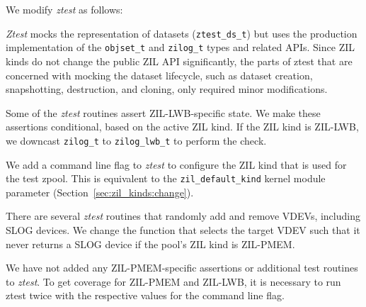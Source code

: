 \documentclass[12pt,a4paper,twoside]{book}
\begin{document}
{We modify \textit{ztest} as follows:
\begin{description}[noitemsep]
    \item[Mocking]  \textit{Ztest} mocks the representation of datasets (\lstinline{ztest_ds_t}) but uses the production implementation of the \lstinline{objset_t} and \lstinline{zilog_t} types and related APIs.
        Since ZIL kinds do not change the public ZIL API significantly, the parts of ztest that are concerned with mocking the dataset lifecycle, such as dataset creation, snapshotting, destruction, and cloning, only required minor modifications.
    \item[ZIL-LWB-Specific Assertions] Some of the \textit{ztest} routines assert ZIL-LWB-specific state.
        We make these assertions conditional, based on the active ZIL kind.
        If the ZIL kind is ZIL-LWB, we downcast \lstinline{zilog_t} to \lstinline{zilog_lwb_t} to perform the check.
    \item[Configurable ZIL Kinds] We add a command line flag to \textit{ztest} to configure the ZIL kind that is used for the test zpool.
        This is equivalent to the \lstinline{zil_default_kind} kernel module parameter (Section~\ref{sec:zil_kinds:change}).
    \item[VDEV Management] There are several \textit{ztest} routines that randomly add and remove VDEVs, including SLOG devices.
        We change the function that selects the target VDEV such that it never returns a SLOG device if the pool's ZIL kind is ZIL-PMEM.
\end{description}
We have not added any ZIL-PMEM-specific assertions or additional test routines to \textit{ztest}.
To get coverage for ZIL-PMEM and ZIL-LWB, it is necessary to run ztest twice with the respective values for the command line flag.

}
\end{document}
